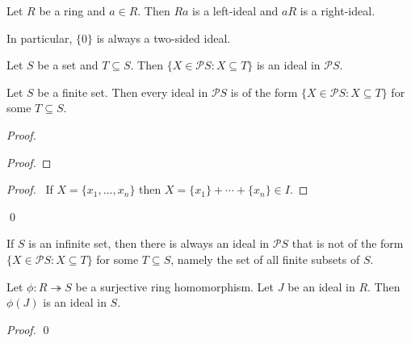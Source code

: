\begin{ex}
Let $R$ be a ring and $a \in R$. Then $Ra$ is a left-ideal and $aR$ is a right-ideal.

In particular, $\{0\}$ is always a two-sided ideal.
\end{ex}

\begin{ex}
Let $S$ be a set and $T \subseteq S$. Then $\{ X \in \mathcal{P} S : X \subseteq T \}$ is an ideal in $\mathcal{P} S$.
\end{ex}

\begin{prop}
Let $S$ be a finite set. Then every ideal in $\mathcal{P} S$ is of the form $\{ X \in \mathcal{P} S : X \subseteq T \}$ for some $T \subseteq S$.
\end{prop}

\begin{proof}
\pf
{}
\begin{proof}
\end{proof}
\begin{proof}
	\pf\ If $X = \{x_1, \ldots, x_n\}$ then $X = \{x_1\} + \cdots + \{x_n\} \in I$.
\end{proof}
\qed
\end{proof}

\begin{ex}
If $S$ is an infinite set, then there is always an ideal in $\mathcal{P} S$ that is not of the form $\{X \in \mathcal{P} S : X \subseteq T \}$ for some $T \subseteq S$, namely the set of all finite subsets of $S$.
\end{ex}

\begin{prop}
Let $\phi : R \twoheadrightarrow S$ be a surjective ring homomorphism. Let $J$ be an ideal in $R$. Then $\phi(J)$ is an ideal in $S$.
\end{prop}

\begin{proof}
\pf
{}
\qed
\end{proof}

